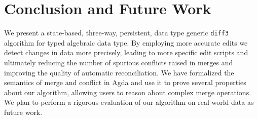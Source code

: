 \documentclass{sigplanconf}
\theoremstyle{plain}
\begin{document}

\section{Conclusion and Future Work}
\label{sec:conclusion}
We present a state-based, three-way, persistent, data type generic
\texttt{diff3} algorithm for typed algebraic data type.
%
By employing more accurate edits we detect changes in data more
precisely, leading to more specific edit scripts and ultimately
reducing the number of spurious conflicts raised in merges and
improving the quality of automatic reconciliation.
%
We have formalized the semantics of merge and conflict in Agda and use
it to prove several properties about our algorithm, allowing users to
reason about complex merge operations.
%
%
We plan to perform a rigorous evaluation of our algorithm on real
world data as future work.
%




\end{document}
